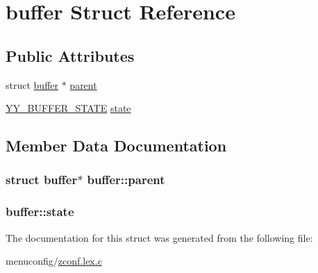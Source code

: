 \hypertarget{structbuffer}{\section{buffer Struct Reference}
\label{structbuffer}
}
\subsection*{Public Attributes}
\begin{DoxyCompactItemize}
\item 
struct \hyperlink{structbuffer}{buffer} $\ast$ \hyperlink{structbuffer_a291636ec7d77cf21e231904d48132f7b}{parent}
\item 
\hyperlink{zconf_8lex_8c_a4e5bd2d129903df83f3d13effaf8f3e4}{Y\-Y\-\_\-\-B\-U\-F\-F\-E\-R\-\_\-\-S\-T\-A\-T\-E} \hyperlink{structbuffer_a5a3e66d8aff7e70c18098bf2d3b64bed}{state}
\end{DoxyCompactItemize}


\subsection{Member Data Documentation}
\hypertarget{structbuffer_a291636ec7d77cf21e231904d48132f7b}{
\subsubsection[{parent}]{\setlength{\rightskip}{0pt plus 5cm}struct {\bf buffer}$\ast$ buffer\-::parent}}\label{structbuffer_a291636ec7d77cf21e231904d48132f7b}
\hypertarget{structbuffer_a5a3e66d8aff7e70c18098bf2d3b64bed}{
\subsubsection[{state}]{ buffer\-::state}}\label{structbuffer_a5a3e66d8aff7e70c18098bf2d3b64bed}


The documentation for this struct was generated from the following file\-:\begin{DoxyCompactItemize}
\item 
menuconfig/\hyperlink{zconf_8lex_8c}{zconf.\-lex.\-c}\end{DoxyCompactItemize}
